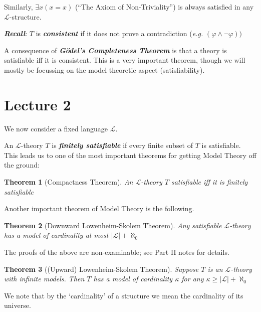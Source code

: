 \documentclass[]{article}
\theoremstyle{custhm}
\theoremstyle{cusdef}
\theoremstyle{custhm}
\theoremstyle{custhm}
\theoremstyle{custhm}
\theoremstyle{ex}
\theoremstyle{custhm}
\newtheorem*{theorem*}{Theorem}
\theoremstyle{cusdef}
\theoremstyle{remark}
\theoremstyle{remark}
\newcommand{\undf}[1]{\textit{\textbf{#1}}}
\renewcommand{\L}{\mathcal{L}}
\renewcommand{\it}[1]{\textit{#1}}
\renewcommand{\phi}{\varphi}
\renewcommand{\lnot}{\neg}
\begin{document}
Similarly, $\exists x(x=x)$ (``The Axiom of Non-Triviality'') is always satisfied in any $\L$-structure.

\undf{Recall}: $T$ is \undf{consistent} if it does not prove a contradiction (\it{e.g.} $(\phi\land\lnot\phi))$

A consequence of \undf{G{\"o}del's Completeness Theorem} is that a theory is satisfiable iff it is consistent. This is a very important theorem, though we will mostly be focussing on the model theoretic aspect (satisfiability).

\section{Lecture 2}

We now consider a fixed language $\L$.

An $\L$-theory $T$ is \undf{finitely satisfiable} if every finite subset of $T$ is satisfiable. This leads us to one of the most important theorems for getting Model Theory off the ground:

\begin{theorem*}[Compactness Theorem]
An $\L$-theory $T$ satisfiable iff it is finitely satisfiable
\end{theorem*}

Another important theorem of Model Theory is the following.

\begin{theorem*}[Downward Lowenheim-Skolem Theorem]
	Any satisfiable $\L$-theory has a model of cardinality at most $|\L|+\aleph_0$
\end{theorem*}

The proofs of the above are non-examinable; see Part II notes for details.

\begin{theorem*}[(Upward) Lowenheim-Skolem  Theorem]
Suppose $T$ is an $\L$-theory with infinite models. Then $T$ has a model of cardinality $\kappa$ for any $\kappa \ge |\L|+\aleph_0$
\end{theorem*}

We note that by the `cardinality' of a structure we mean the cardinality of its universe.
\end{document}
